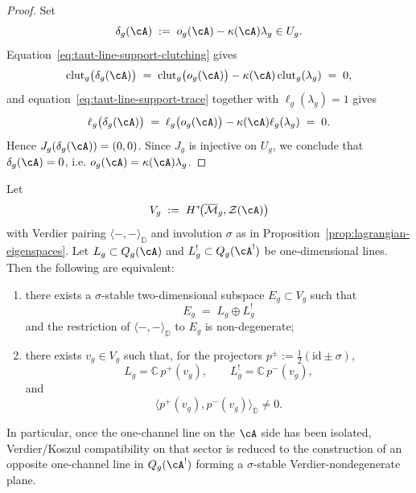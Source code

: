 \begin{proof}
Set
\[
\delta_g(\cA)
\;:=\;
o_g(\cA)-\kappa(\cA)\lambda_g \in U_g.
\]
Equation~\eqref{eq:taut-line-support-clutching} gives
\[
\mathrm{clut}_g\bigl(\delta_g(\cA)\bigr)
\;=\;
\mathrm{clut}_g\bigl(o_g(\cA)\bigr)
- \kappa(\cA)\,\mathrm{clut}_g(\lambda_g)
\;=\; 0,
\]
and equation~\eqref{eq:taut-line-support-trace} together with
$\ell_g(\lambda_g)=1$ gives
\[
\ell_g\bigl(\delta_g(\cA)\bigr)
\;=\;
\ell_g\bigl(o_g(\cA)\bigr)-\kappa(\cA)\ell_g(\lambda_g)
\;=\; 0.
\]
Hence $J_g(\delta_g(\cA))=(0,0)$.  Since $J_g$ is injective on $U_g$,
we conclude that $\delta_g(\cA)=0$, i.e.
$o_g(\cA)=\kappa(\cA)\lambda_g$.
\end{proof}

\begin{proposition}\label{prop:one-channel-verdier-criterion}
Let
\[
V_g \;:=\; H^*\!\bigl(\overline{\mathcal{M}}_g, \mathcal{Z}(\cA)\bigr)
\]
with Verdier pairing $\langle-,-\rangle_{\mathbb{D}}$ and involution
$\sigma$ as in Proposition~\ref{prop:lagrangian-eigenspaces}.  Let
$L_g \subset Q_g(\cA)$ and $L_g^! \subset Q_g(\cA^!)$ be
one-dimensional lines.
Then the following are equivalent:
\begin{enumerate}[label=\textup{(\roman*)}]
\item there exists a $\sigma$-stable two-dimensional subspace
  $E_g \subset V_g$ such that
  \[
  E_g \;=\; L_g \oplus L_g^!
  \]
  and the restriction of $\langle-,-\rangle_{\mathbb{D}}$ to $E_g$ is
  non-degenerate;
\item there exists $v_g \in V_g$ such that, for the projectors
  $p^\pm := \tfrac12(\mathrm{id}\pm\sigma)$,
  \[
  L_g = \mathbb{C}\,p^+(v_g), \qquad
  L_g^! = \mathbb{C}\,p^-(v_g),
  \]
  and
  \[
  \bigl\langle p^+(v_g), p^-(v_g)\bigr\rangle_{\mathbb{D}} \neq 0.
  \]
\end{enumerate}
In particular, once the one-channel line on the $\cA$ side has been
isolated, Verdier/Koszul compatibility on that sector is reduced to the
construction of an opposite one-channel line in $Q_g(\cA^!)$ forming a
$\sigma$-stable Verdier-nondegenerate plane.
\end{proposition}

